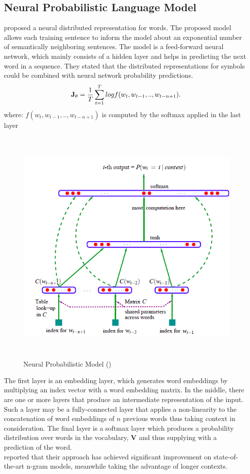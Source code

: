 \subsection{Neural Probabilistic Language Model}
\cite{bengio2003neural} proposed a neural distributed representation for words. The proposed model allows each training sentence to inform the model about an exponential number of semantically neighboring sentences. The model is a feed-forward neural network, which mainly consists of a hidden layer and helps in predicting the next word in a sequence. They stated that the distributed representations for symbols could be combined with neural network probability predictions. 
\begin{equation}
\mathbf{J}_\theta = \frac{1}{T}\sum_{t=1}^{T}log f(w_t,w_{t-1},..,w_{t-n+1})\\.
\end{equation}
where: $f(w_t,w_{t-1},..,w_{t-n+1})$ is computed by the softmax applied in the last layer
\begin{figure}[H]
	\centering
	\includegraphics[width=15cm,height=12cm,keepaspectratio]{files/npmodel.png}
	\caption{Neural Probabilistic Model (\cite{bengio2003neural})}
	\label{fig:npm}
\end{figure}
The first layer is an embedding layer, which generates word embeddings by multiplying an index vector with a word embedding matrix. In the middle, there are one or more layers that produce an intermediate representation of the input. Such a layer may be a fully-connected layer that applies a non-linearity to the concatenation of word embeddings of $n$ previous words thus taking context in consideration. The final layer is a softmax layer which produces a probability distribution over words in the vocabulary, $\mathbf{V}$ and thus supplying with a prediction of the word.\\
\cite{bengio2003neural} reported that their approach has achieved significant improvement on state-of-the-art n-gram models, meanwhile taking the advantage of longer contexts.

